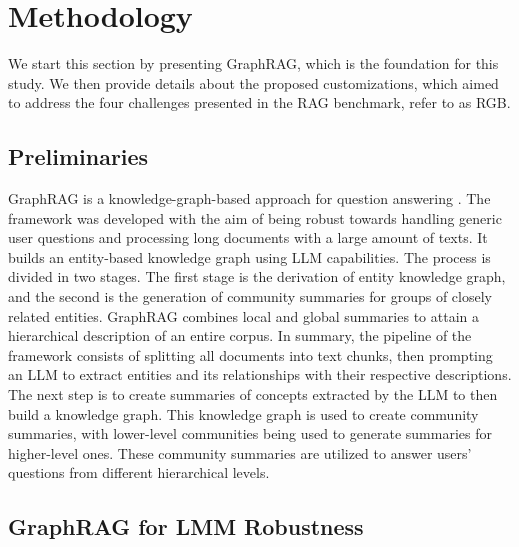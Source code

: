 \documentclass[letterpaper, 10 pt, conference]{ieeeconf}  %
\begin{document}
\section{Methodology}
\label{sec:methodology}

We start this section by presenting GraphRAG, which is the foundation for this study. We then provide details about the proposed customizations, which aimed to address the four challenges presented in the RAG benchmark, refer to as RGB.

\subsection{Preliminaries}

GraphRAG is a knowledge-graph-based approach for question answering \cite{edge2024local}. The framework was developed with the aim of being robust towards handling generic user questions and processing long documents with a large amount of texts. It builds an entity-based knowledge graph using LLM capabilities. The process is divided in two stages. The first stage is the derivation of entity knowledge graph, and the second is the generation of community summaries for groups of closely related entities. GraphRAG combines local and global summaries to attain a hierarchical description of an entire corpus. In summary, the pipeline of the framework consists of splitting all documents into text chunks, then prompting an LLM to extract entities and its relationships with their respective descriptions. The next step is to create summaries of concepts extracted by the LLM to then build a knowledge graph. This knowledge graph is used to create community summaries, with lower-level communities being used to generate summaries for higher-level ones. These community summaries are utilized to answer users' questions from different hierarchical levels.%


\subsection{GraphRAG for LMM Robustness}
\end{document}
